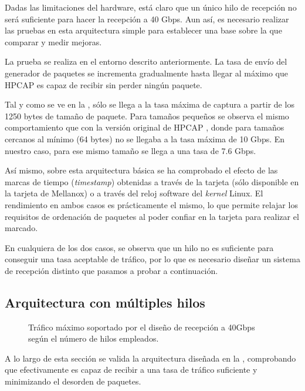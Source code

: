 \documentclass[twoside, 12pt, draft]{epstfg}
\begin{document}
Dadas las limitaciones del hardware, está claro que un único hilo de recepción no será suficiente para hacer la recepción a 40 Gbps. Aun así, es necesario realizar las pruebas en esta arquitectura simple para establecer una base sobre la que comparar y medir mejoras.

La prueba se realiza en el entorno descrito anteriormente. La tasa de envío del generador de paquetes se incrementa gradualmente hasta llegar al máximo que HPCAP es capaz de recibir sin perder ningún paquete.

Tal y como se ve en la , sólo se llega a la tasa máxima de captura a partir de los 1250 bytes de tamaño de paquete. Para tamaños pequeños se observa el mismo comportamiento que con la versión original de HPCAP \citep{MorenoTFM2012}, donde para tamaños cercanos al mínimo (64 bytes) no se llegaba a la tasa máxima de 10 Gbps. En nuestro caso, para ese mismo tamaño se llega a una tasa de 7.6 Gbps.

Así mismo, sobre esta arquitectura básica se ha comprobado el efecto de las marcas de tiempo (\textit{timestamp}) obtenidas a través de la tarjeta (sólo disponible en la tarjeta de Mellanox) o a través del reloj software del \textit{kernel} Linux. El rendimiento en ambos casos es prácticamente el mismo, lo que permite relajar los requisitos de ordenación de paquetes al poder confiar en la tarjeta para realizar el marcado.

En cualquiera de los dos casos, se observa que un hilo no es suficiente para conseguir una tasa aceptable de tráfico, por lo que es necesario diseñar un sistema de recepción distinto que pasamos a probar a continuación.

\subsection{Arquitectura con múltiples hilos}

\begin{figure}[hbtp]
\caption[Capacidad del diseño de recepción a 40 Gbps]{Tráfico máximo soportado por el diseño de recepción a 40Gbps según el número de hilos empleados.}
\label{fig:Validacion:MulticoreMaxRate}
\end{figure}

A lo largo de esta sección se valida la arquitectura diseñada en la , comprobando que efectivamente es capaz de recibir a una tasa de tráfico suficiente y minimizando el desorden de paquetes.
\end{document}
